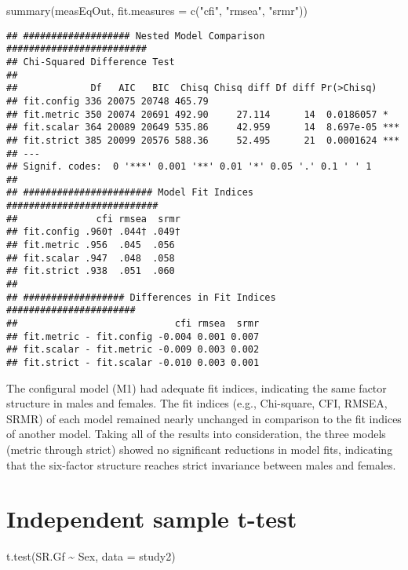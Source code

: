 \documentclass[
]{article}
\newenvironment{Shaded}{\begin{snugshade}}{\end{snugshade}}
\newcommand{\AttributeTok}[1]{\textcolor[rgb]{0.77,0.63,0.00}{#1}}
\newcommand{\FunctionTok}[1]{\textcolor[rgb]{0.00,0.00,0.00}{#1}}
\newcommand{\NormalTok}[1]{#1}
\newcommand{\SpecialCharTok}[1]{\textcolor[rgb]{0.00,0.00,0.00}{#1}}
\newcommand{\StringTok}[1]{\textcolor[rgb]{0.31,0.60,0.02}{#1}}
\begin{document}
\begin{Shaded}
\begin{Highlighting}[]
\FunctionTok{summary}\NormalTok{(measEqOut, }\AttributeTok{fit.measures =} \FunctionTok{c}\NormalTok{(}\StringTok{"cfi"}\NormalTok{, }\StringTok{"rmsea"}\NormalTok{, }\StringTok{"srmr"}\NormalTok{))}
\end{Highlighting}
\end{Shaded}

\begin{verbatim}
## ################### Nested Model Comparison #########################
## Chi-Squared Difference Test
## 
##             Df   AIC   BIC  Chisq Chisq diff Df diff Pr(>Chisq)    
## fit.config 336 20075 20748 465.79                                  
## fit.metric 350 20074 20691 492.90     27.114      14  0.0186057 *  
## fit.scalar 364 20089 20649 535.86     42.959      14  8.697e-05 ***
## fit.strict 385 20099 20576 588.36     52.495      21  0.0001624 ***
## ---
## Signif. codes:  0 '***' 0.001 '**' 0.01 '*' 0.05 '.' 0.1 ' ' 1
## 
## ####################### Model Fit Indices ###########################
##              cfi rmsea  srmr
## fit.config .960† .044† .049†
## fit.metric .956  .045  .056 
## fit.scalar .947  .048  .058 
## fit.strict .938  .051  .060 
## 
## ################## Differences in Fit Indices #######################
##                            cfi rmsea  srmr
## fit.metric - fit.config -0.004 0.001 0.007
## fit.scalar - fit.metric -0.009 0.003 0.002
## fit.strict - fit.scalar -0.010 0.003 0.001
\end{verbatim}

The configural model (M1) had adequate fit indices, indicating the same
factor structure in males and females. The fit indices (e.g.,
Chi-square, CFI, RMSEA, SRMR) of each model remained nearly unchanged in
comparison to the fit indices of another model. Taking all of the
results into consideration, the three models (metric through strict)
showed no significant reductions in model fits, indicating that the
six-factor structure reaches strict invariance between males and
females.

\hypertarget{independent-sample-t-test}{%
\section{Independent sample t-test}\label{independent-sample-t-test}}

\begin{Shaded}
\begin{Highlighting}[]
\FunctionTok{t.test}\NormalTok{(SR.Gf }\SpecialCharTok{\textasciitilde{}}\NormalTok{ Sex, }\AttributeTok{data =}\NormalTok{ study2)}
\end{Highlighting}
\end{Shaded}
\end{document}
